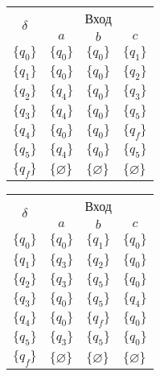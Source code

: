 \begin{enumerate}[label=(\roman{*})]
\begin{enumerate}
\begin{figure}
\centering
\begin{subfigure}[b]{.4\linewidth}
\centering
			\begin{tabular}{llll}
				\toprule
				\multicolumn{1}{c}{\multirow{2}{*}{\Large $\delta$}}
				& \multicolumn{3}{c}{Вход} \\
				\cmidrule(rl){2-4}
				& \multicolumn{1}{c}{$a$}
				& \multicolumn{1}{c}{$b$} 
				& \multicolumn{1}{c}{$c$} \\
				\midrule
				$\{q_0\}$       & $\{q_0\}$      		 & $\{q_0\}$     &$\{q_1\}$  \\
				$\{q_1\}$       & $\{q_0\}$    			 & $\{q_0\}$     &$\{q_2\}$ \\
				$\{q_2\}$       & $\{q_4\}$    			 & $\{q_0\}$     &$\{q_3\}$  \\
				$\{q_3\}$       & $\{q_4\}$    			 & $\{q_0\}$     &$\{q_5\}$  \\
				$\{q_4\}$       & $\{q_0\}$    			 & $\{q_0\}$     &$\{q_f\}$  \\
				$\{q_5\}$       & $\{q_4\}$    			 & $\{q_0\}$     &$\{q_5\}$  \\
				$\{q_f\}$       & $\{\varnothing\}$    	 & $\{\varnothing\}$     &$\{\varnothing\}$  \\
				\bottomrule
			\end{tabular}
\caption{}\label{app-ex-task2-7}
\end{subfigure}%
%
\begin{subfigure}[b]{.4\linewidth}
\centering
			\begin{tabular}{llll}
				\toprule
				\multicolumn{1}{c}{\multirow{2}{*}{\Large $\delta$}}
				& \multicolumn{3}{c}{Вход} \\
				\cmidrule(rl){2-4}
				& \multicolumn{1}{c}{$a$}
				& \multicolumn{1}{c}{$b$} 
				& \multicolumn{1}{c}{$c$} \\
				\midrule
				$\{q_0\}$       & $\{q_0\}$      		 & $\{q_1\}$     &$\{q_0\}$  \\
				$\{q_1\}$       & $\{q_3\}$    			 & $\{q_2\}$     &$\{q_0\}$ \\
				$\{q_2\}$       & $\{q_3\}$    			 & $\{q_5\}$     &$\{q_0\}$  \\
				$\{q_3\}$       & $\{q_0\}$    			 & $\{q_5\}$     &$\{q_4\}$  \\
				$\{q_4\}$       & $\{q_0\}$    			 & $\{q_f\}$     &$\{q_0\}$  \\
				$\{q_5\}$       & $\{q_3\}$    			 & $\{q_5\}$     &$\{q_0\}$ \\
				$\{q_f\}$       & $\{\varnothing\}$    	 & $\{\varnothing\}$     &$\{\varnothing\}$  \\
				\bottomrule
			\end{tabular}
\caption{}\label{app-ex-task2-8}
\end{subfigure}
\caption{}\label{app-ex-task2-9}
\end{figure}
		

\end{enumerate}
\end{enumerate}
